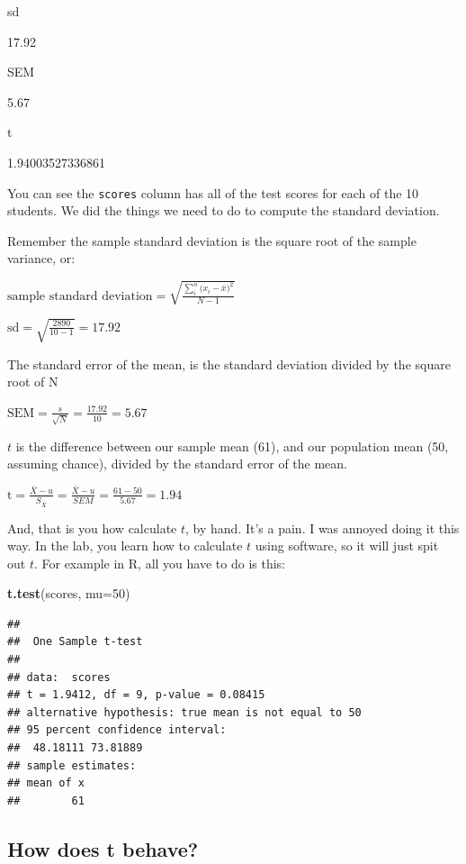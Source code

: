\documentclass[
]{book}
\newenvironment{Shaded}{\begin{snugshade}}{\end{snugshade}}
\newcommand{\DataTypeTok}[1]{\textcolor[rgb]{0.13,0.29,0.53}{#1}}
\newcommand{\DecValTok}[1]{\textcolor[rgb]{0.00,0.00,0.81}{#1}}
\newcommand{\KeywordTok}[1]{\textcolor[rgb]{0.13,0.29,0.53}{\textbf{#1}}}
\newcommand{\NormalTok}[1]{#1}
\begin{document}
sd

17.92

SEM

5.67

t

1.94003527336861

You can see the \texttt{scores} column has all of the test scores for each of the 10 students. We did the things we need to do to compute the standard deviation.

Remember the sample standard deviation is the square root of the sample variance, or:

\(\text{sample standard deviation} = \sqrt{\frac{\sum_{i}^{n}({x_{i}-\bar{x})^2}}{N-1}}\)

\(\text{sd} = \sqrt{\frac{2890}{10-1}} = 17.92\)

The standard error of the mean, is the standard deviation divided by the square root of N

\(\text{SEM} = \frac{s}{\sqrt{N}} = \frac{17.92}{10} = 5.67\)

\(t\) is the difference between our sample mean (61), and our population mean (50, assuming chance), divided by the standard error of the mean.

\(\text{t} = \frac{\bar{X}-u}{S_{\bar{X}}} = \frac{\bar{X}-u}{SEM} = \frac{61-50}{5.67} = 1.94\)

And, that is you how calculate \(t\), by hand. It's a pain. I was annoyed doing it this way. In the lab, you learn how to calculate \(t\) using software, so it will just spit out \(t\). For example in R, all you have to do is this:

\begin{Shaded}
\begin{Highlighting}[]
\KeywordTok{t.test}\NormalTok{(scores, }\DataTypeTok{mu=}\DecValTok{50}\NormalTok{)}
\end{Highlighting}
\end{Shaded}

\begin{verbatim}
## 
## 	One Sample t-test
## 
## data:  scores
## t = 1.9412, df = 9, p-value = 0.08415
## alternative hypothesis: true mean is not equal to 50
## 95 percent confidence interval:
##  48.18111 73.81889
## sample estimates:
## mean of x 
##        61
\end{verbatim}

\hypertarget{how-does-t-behave}{%
\subsection{How does t behave?}\label{how-does-t-behave}}
\end{document}
